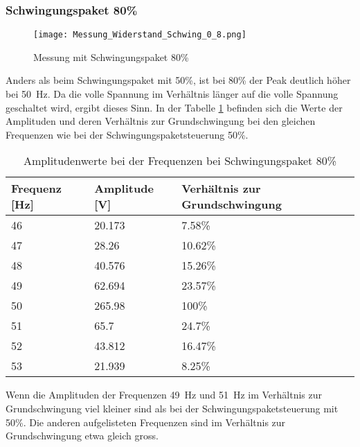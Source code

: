 \newpage
\subsubsection*{Schwingungspaket 80\%}
\begin{figure}[ht!]
	\centering
	\texttt{[image: Messung\_Widerstand\_Schwing\_0\_8.png]}	
	\caption{Messung mit Schwingungspaket 80\%}\label{fig:Mess_Schwing_80}
\end{figure}

Anders als beim Schwingungspaket mit 50\%, ist bei 80\% der Peak deutlich höher bei \SI{50}{Hz}. Da die volle Spannung im Verhältnis länger auf die volle Spannung geschaltet wird, ergibt dieses Sinn. In der Tabelle \ref{tab:Mess_Spannung_Schwing_80} befinden sich die Werte der Amplituden und deren Verhältnis zur Grundschwingung bei den gleichen Frequenzen wie bei der Schwingungspaketsteuerung 50\%.

\begin{table}[ht!]
	\centering
	\begin{tabular}{|l|l|l|}
		\hline
		Frequenz {[}Hz{]} & Amplitude {[}V{]} & Verhältnis zur Grundschwingung \\ \hline
		46                & 20.173            & 7.58\%                         \\ \hline
		47                & 28.26             & 10.62\%                        \\ \hline
		48                & 40.576            & 15.26\%                        \\ \hline
		49                & 62.694            & 23.57\%                        \\ \hline
		50                & 265.98            & 100\%                          \\ \hline
		51                & 65.7              & 24.7\%                         \\ \hline
		52                & 43.812            & 16.47\%                        \\ \hline
		53                & 21.939            & 8.25\%                         \\ \hline
	\end{tabular}
\caption{Amplitudenwerte bei der Frequenzen bei Schwingungspaket 80\%}\label{tab:Mess_Spannung_Schwing_80}
\end{table}

Wenn die Amplituden der Frequenzen \SI{49}{Hz} und \SI{51}{Hz} im Verhältnis zur Grundschwingung viel kleiner sind als bei der Schwingungspaketsteuerung mit 50\%. Die anderen aufgelisteten Frequenzen sind im Verhältnis zur Grundschwingung etwa gleich gross.\\


